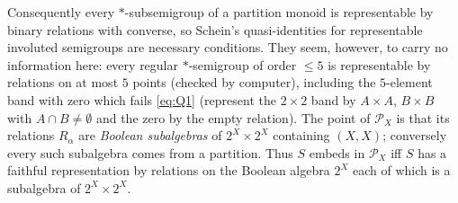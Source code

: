 \documentclass[11pt]{amsart}
\theoremstyle{definition}
\renewcommand{\P}{\mathcal{P}}
\begin{document}
Consequently every $*$-subsemigroup of a partition monoid is representable by binary relations with converse, so Schein's quasi-identities for representable involuted semigroups are necessary conditions. They seem, however, to carry no information here: every regular $*$-semigroup of order $\le5$ is representable by relations on at most $5$ points (checked by computer), including the $5$-element band with zero which fails \eqref{eq:Q1} (represent the $2\times2$ band by $A\times A$, $B\times B$ with $A\cap B\ne\emptyset$ and the zero by the empty relation). The point of $\P_X$ is that its relations $R_\alpha$ are \emph{Boolean subalgebras} of $2^X\times2^X$ containing $(X,X)$; conversely every such subalgebra comes from a partition. Thus $S$ embeds in $\P_X$ iff $S$ has a faithful representation by relations on the Boolean algebra $2^X$ each of which is a subalgebra of $2^X\times 2^X$.
\end{document}
